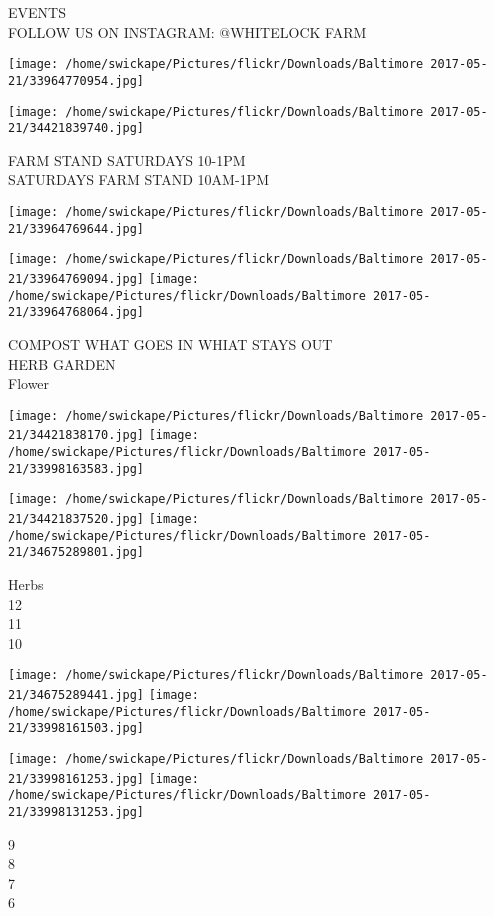 \documentclass[10pt,letterpaper]{article}
\begin{document}
EVENTS\\
FOLLOW US ON INSTAGRAM: @WHITELOCK FARM
\pagebreak

\texttt{[image: /home/swickape/Pictures/flickr/Downloads/Baltimore 2017-05-21/33964770954.jpg]}

\vspace{0.25in}
\texttt{[image: /home/swickape/Pictures/flickr/Downloads/Baltimore 2017-05-21/34421839740.jpg]}

FARM STAND SATURDAYS 10{-}1PM\\
SATURDAYS FARM STAND 10AM{-}1PM
\pagebreak

\texttt{[image: /home/swickape/Pictures/flickr/Downloads/Baltimore 2017-05-21/33964769644.jpg]}

\vspace{0.25in}
\texttt{[image: /home/swickape/Pictures/flickr/Downloads/Baltimore 2017-05-21/33964769094.jpg]}
\texttt{[image: /home/swickape/Pictures/flickr/Downloads/Baltimore 2017-05-21/33964768064.jpg]}

COMPOST WHAT GOES IN WHIAT STAYS OUT\\
HERB GARDEN\\
Flower
\pagebreak

\texttt{[image: /home/swickape/Pictures/flickr/Downloads/Baltimore 2017-05-21/34421838170.jpg]}
\texttt{[image: /home/swickape/Pictures/flickr/Downloads/Baltimore 2017-05-21/33998163583.jpg]}

\texttt{[image: /home/swickape/Pictures/flickr/Downloads/Baltimore 2017-05-21/34421837520.jpg]}
\texttt{[image: /home/swickape/Pictures/flickr/Downloads/Baltimore 2017-05-21/34675289801.jpg]}

Herbs\\
12\\
11\\
10
\pagebreak

\texttt{[image: /home/swickape/Pictures/flickr/Downloads/Baltimore 2017-05-21/34675289441.jpg]}
\texttt{[image: /home/swickape/Pictures/flickr/Downloads/Baltimore 2017-05-21/33998161503.jpg]}

\texttt{[image: /home/swickape/Pictures/flickr/Downloads/Baltimore 2017-05-21/33998161253.jpg]}
\texttt{[image: /home/swickape/Pictures/flickr/Downloads/Baltimore 2017-05-21/33998131253.jpg]}

9\\
8\\
7\\
6
\pagebreak
\end{document}
